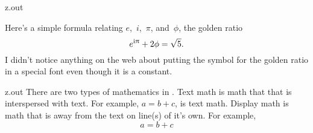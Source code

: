 \MyIO


\begin{VerbatimOut}{z.out}

Here's a simple formula relating $e$,~$i$,~$\pi$, and~$\phi$,
the golden ratio
\begin{equation}
  e^{\i\pi} + 2\phi = \sqrt 5.
\end{equation}
I didn't notice anything on the web about putting the symbol for
the golden ratio in a special font even though it is a constant.
\end{VerbatimOut}

\MyIO


\begin{VerbatimOut}{z.out}
There are two types of mathematics in \LuaLaTeXLogo.
Text math is math that that is interspersed with text.
For example, \(a = b + c\), is text math.
Display math is math that is away from the text on
line(s) of it's own.
For example,
\begin{equation}
  a = b + c
\end{equation}
\end{VerbatimOut}

\MyIO


